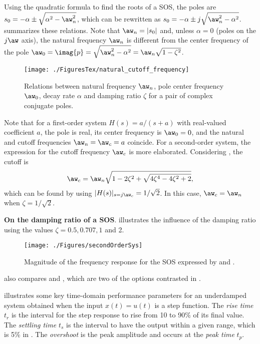 Using the quadratic formula to find the roots of a SOS, the poles are $s_0=-\alpha \pm \sqrt{\alpha^2 - \aw_n^2}$, which can be rewritten as $s_0=-\alpha \pm j \sqrt{\aw_n^2 - \alpha^2}$. 
 summarizes these relations.
Note that $\aw_n = |s_0|$ and, unless $\alpha = 0$ (poles on the $j \aw$ axis), the natural frequency $\aw_n$ is different from the center frequency of the pole $\aw_0 = \imag{p} = \sqrt{\aw_n^2 - \alpha^2} = \aw_n \sqrt{1 - \zeta^2}$. 

\begin{figure}
\centering
\texttt{[image: ./FiguresTex/natural\_cutoff\_frequency]}%
\caption{Relations between natural frequency $\aw_n$, pole center frequency $\aw_0$,  
decay rate $\alpha$ and damping ratio $\zeta$ for a pair of complex conjugate poles.\label{fig:natural_cutoff_frequency}}
\end{figure}

Note that for a first-order system $H(s)=a/(s+a)$ with real-valued coefficient $a$, the pole is real, its center frequency is $\aw_0 = 0$, and the natural and cutoff frequencies $\aw_n = \aw_c = a$ coincide. For a second-order system, the expression for the cutoff frequency $\aw_c$ is more elaborated. Considering , the cutoff is
\begin{equation}
\aw_c = \aw_n \sqrt{ 1 - 2 \zeta^2 + \sqrt{4\zeta^4 - 4\zeta^2 + 2}},
\end{equation}
which can be found by using $|H(s)|_{s=j \aw_c}=1/\sqrt{2}$.
In this case, $\aw_c = \aw_n$ when $\zeta=1/\sqrt{2}$.

\bExample \textbf{On the damping ratio of a SOS}.
 illustrates the influence of the damping ratio using the values
$\zeta = 0.5, 0.707, 1$ and 2.

\begin{figure}
\centering
\texttt{[image: ./Figures/secondOrderSys]}
\caption{Magnitude of the frequency response for the SOS expressed by  and .\label{fig:secondOrderSys}}
\end{figure}

 also compares  and , which are two of the options contrasted in .
\eExample

 illustrates some key time-domain performance parameters for an
underdamped system obtained when the input $x(t)=u(t)$ is a step function. The \emph{rise time} $t_r$ is the interval for the step response to rise from 10 to 90\% of its final value.
The \emph{settling time} $t_s$ is the interval to have the output within a given range, which is 5\% in . The \emph{overshoot} is the peak amplitude and occurs
at the \emph{peak time} $t_p$.


